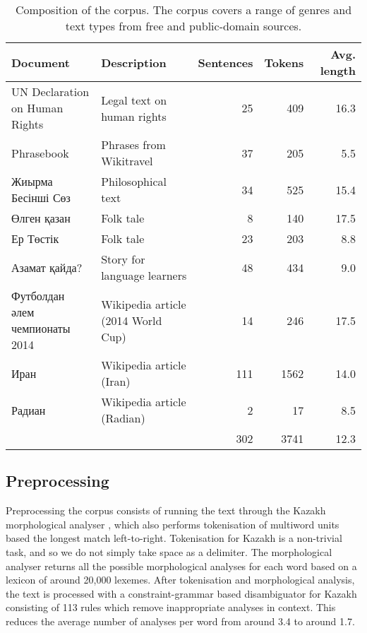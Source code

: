 \documentclass[a4paper,11pt, onecolumn]{article}
\begin{document}
\begin{table}
  \centering
\begin{small}
  \begin{tabular}{|l|l|r|r|r|}
    \hline
    \textbf{Document} & \textbf{Description} & \textbf{Sentences} & \textbf{Tokens} & \textbf{Avg. length}\\
    \hline
    UN Declaration on Human Rights & Legal text on human rights & 25 & 409 & 16.3 \\
    Phrasebook                     & Phrases from Wikitravel   & 37 & 205 & 5.5 \\
    Жиырма Бесінші Сөз             & Philosophical text        & 34 & 525 & 15.4 \\ 
    Өлген қазан                    & Folk tale                  & 8 & 140 & 17.5 \\
    Ер Төстік                      & Folk tale                  & 23 & 203 & 8.8 \\
    Азамат қайда?                  & Story for language learners & 48 & 434 & 9.0 \\
    Футболдан әлем чемпионаты 2014 & Wikipedia article (2014 World Cup) & 14 & 246 & 17.5 \\
    Иран & Wikipedia article (Iran)                                & 111 & 1562 & 14.0 \\
    Радиан & Wikipedia article (Radian)                            & 2 & 17 & 8.5 \\
    \hline
    \multicolumn{2}{c|}{~} & 302 & 3741 & 12.3 \\\cline{3-5}
  \end{tabular}
\end{small}
  \caption{Composition of the corpus. The corpus covers a range of genres and text types from 
    free and public-domain sources.}
\end{table}


\subsection{Preprocessing}

Preprocessing the corpus consists of running the text through the Kazakh morphological
analyser \citep{Washington14}, which also performs tokenisation of multiword units based 
the longest match left-to-right. Tokenisation for Kazakh is a non-trivial task, and so
we do not simply take space as a delimiter. The morphological analyser returns all 
the possible morphological analyses for each word based on a lexicon of around 20,000 lexemes.
After tokenisation and morphological analysis, the text is processed with a constraint-grammar 
based disambiguator for Kazakh consisting of 113 rules which remove inappropriate 
analyses in context. This reduces the average number of analyses per word from around 3.4
to around 1.7.
\end{document}
